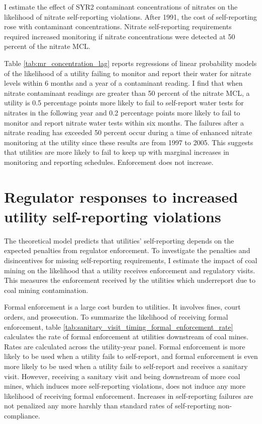 \documentclass{article}
\begin{document}
I estimate the effect of SYR2 contaminant concentrations of nitrates on the likelihood of nitrate self-reporting violations. After 1991, the cost of self-reporting rose with contaminant concentrations. Nitrate self-reporting requirements required increased monitoring if nitrate concentrations were detected at 50 percent of the nitrate MCL.

Table \ref{tab:mr_concentration_lag} reports regressions of linear probability models of the likelihood of a utility failing to monitor and report their water for nitrate levels within 6 months and a year of a contaminant reading. I find that when nitrate contaminant readings are greater than 50 percent of the nitrate MCL, a utility is 0.5 percentage points more likely to fail to self-report water tests for nitrates in the following year and 0.2 percentage points more likely to fail to monitor and report nitrate water tests within six months. The failures after a nitrate reading has exceeded 50 percent occur during a time of enhanced nitrate monitoring at the utility since these results are from 1997 to 2005. This suggests that utilities are more likely to fail to keep up with marginal increases in monitoring and reporting schedules. Enforcement does not increase. 





\section{Regulator responses to increased utility self-reporting violations}

The theoretical model predicts that utilities' self-reporting depends on the expected penalties from regulator enforcement. To investigate the penalties and disincentives for missing self-reporting requirements, I estimate the impact of coal mining on the likelihood that a utility receives enforcement and regulatory visits. This measures the enforcement received by the utilities which underreport due to coal mining contamination.



Formal enforcement is a large cost burden to utilities. It involves fines, court orders, and prosecution. To summarize the likelihood of receiving formal enforcement, table \ref{tab:sanitary_visit_timing_formal_enforcement_rate} calculates the rate of formal enforcement at utilities downstream of coal mines. Rates are calculated across the utility-year panel. Formal enforcement is more likely to be used when a utility fails to self-report, and formal enforcement is even more likely to be used when a utility fails to self-report and receives a sanitary visit. However, receiving a sanitary visit and being downstream of more coal mines, which induces more self-reporting violations, does not induce any more likelihood of receiving formal enforcement. Increases in self-reporting failures are not penalized any more harshly than standard rates of self-reporting non-compliance.
\end{document}
